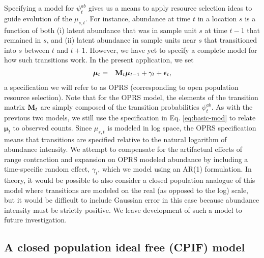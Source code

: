 \documentclass[12pt,english]{article}
\begin{document}
\begin{spacing}{1.9}
Specifying a model for $\psi^{ab}_t$ gives us a means to apply resource selection ideas to guide evolution of the $\mu_{s,t}$.  For instance, abundance at time $t$ in a location $s$ is a function of both (i) latent abundance that was in sample unit $s$ at time $t-1$ that remained in $s$, and (ii) latent abundance in sample units near $s$ that transitioned into $s$ between $t$ and $t+1$.  However, we have yet to specify a complete model for how such transitions work.  In the present application, we set
\begin{eqnarray*}
  \boldsymbol{\mu}_t & = & {\bf M}_t \boldsymbol{\mu}_{t-1} + \gamma_t + \boldsymbol{\epsilon}_t, %
\end{eqnarray*}
a specification we will refer to as OPRS (corresponding to open population resource selection). Note that for the OPRS model, the elements of the transition matrix ${\bf M}_t$ are simply composed of the transition probabilities $\psi_t^{ab}$.  As with the previous two models, we still use the specification in Eq. \ref{eq:basic-mod} to relate $\boldsymbol{\mu}_t$ to observed counts.
Since $\mu_{s,t}$ is modeled in log space, the OPRS specification means that transitions are specified relative to the natural logarithm of abundance intensity. We attempt to compensate for the artifactual effects of range contraction and expansion on OPRS modeled abundance by including a time-specific random effect, $\gamma_t$, which we model using an AR(1) formulation.  In theory, it would be possible to also consider a closed population analogue of this model where transitions are modeled on the real (as opposed to the log) scale, but it would be difficult to include Gaussian error in this case because abundance intensity must be strictly positive.  We leave development of such a model to future investigation.


\subsection{A closed population ideal free (CPIF) model}


\end{spacing}
\end{document}
